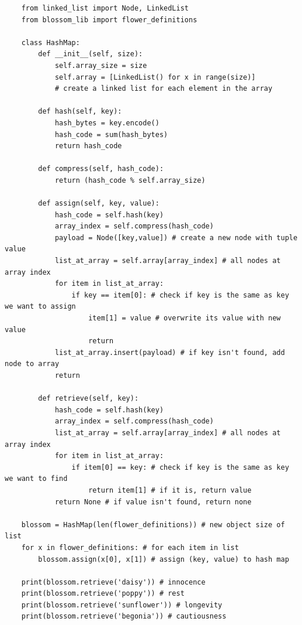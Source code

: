 \documentclass[11pt, a4paper]{article}
\begin{document}
\begin{spacing}{1.1}
\begin{lstlisting}
	from linked_list import Node, LinkedList
	from blossom_lib import flower_definitions 
	
	class HashMap:
		def __init__(self, size):
			self.array_size = size
			self.array = [LinkedList() for x in range(size)] 
			# create a linked list for each element in the array
		
		def hash(self, key):
			hash_bytes = key.encode()
			hash_code = sum(hash_bytes)
			return hash_code
		
		def compress(self, hash_code):
			return (hash_code % self.array_size)
		
		def assign(self, key, value):
			hash_code = self.hash(key)
			array_index = self.compress(hash_code)
			payload = Node([key,value]) # create a new node with tuple value
			list_at_array = self.array[array_index] # all nodes at array index
			for item in list_at_array:
				if key == item[0]: # check if key is the same as key we want to assign
					item[1] = value # overwrite its value with new value
					return
			list_at_array.insert(payload) # if key isn't found, add node to array
			return
		
		def retrieve(self, key):
			hash_code = self.hash(key)
			array_index = self.compress(hash_code)
			list_at_array = self.array[array_index] # all nodes at array index
			for item in list_at_array:
				if item[0] == key: # check if key is the same as key we want to find
					return item[1] # if it is, return value
			return None # if value isn't found, return none
	
	blossom = HashMap(len(flower_definitions)) # new object size of list
	for x in flower_definitions: # for each item in list
		blossom.assign(x[0], x[1]) # assign (key, value) to hash map
	
	print(blossom.retrieve('daisy')) # innocence 
	print(blossom.retrieve('poppy')) # rest
	print(blossom.retrieve('sunflower')) # longevity
	print(blossom.retrieve('begonia')) # cautiousness
	\end{lstlisting} \newpage


\end{spacing}
\end{document}
